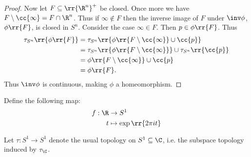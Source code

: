 \documentclass{article}
\begin{document}
\begin{claim*}
\begin{proof}
		Now let $F\subseteq \rr{\R^n}^+$ be closed. Once more we have
		$F\setminus\cc{\infty}=F\cap\R^n$. Thus if $\infty\not\in F$ then
		the inverse image of $F$ under $\inv\phi$, $\phi\rr{F}$, is closed in $S^n$.
		Consider the case $\infty\in F$. Then $p\in\phi\rr{F}$. Thus
		\begin{align*}
			\tau_{S^n}\rr{\phi\rr{F}} & = \tau_{S^n}\rr{\phi\rr{F\setminus\cc{\infty}}\cup\cc{p}}                \\
			                          & = \tau_{S^n}\rr{\phi\rr{F\setminus\cc{\infty}}}\cup\tau_{S^n}\rr{\cc{p}} \\
			                          & = \phi\rr{F\setminus\cc{\infty}}\cup\cc{p}                               \\
			                          & = \phi\rr{F}.
		\end{align*}
		Thus $\inv\phi$ is continuous, making $\phi$ a homeomorphism.
	\end{proof}
\end{claim*}

Define the following map:
\begin{align*}
	f : \R & \to S^1                  \\
	t      & \mapsto \exp\rr{2\pi it}
\end{align*}

Let $\tau:S^1\to S^1$ denote the usual topology on $S^1\subseteq\C$, i.e.
the subspace topology induced by $\tau_\C$.
\end{document}
